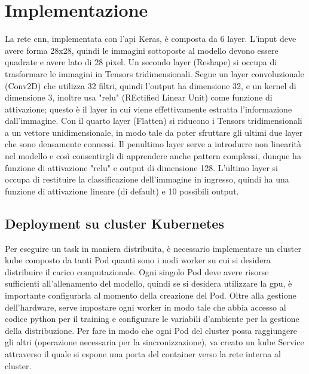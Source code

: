 \documentclass[12pt,a4paper,fleqn,titlepage]{report}
\begin{document}
    \section{Implementazione}
        La rete \gls{cnn}, implementata con l'\gls{api} Keras, è composta da 6 layer. L'input deve avere forma 28x28, quindi le immagini sottoposte al modello devono essere quadrate e avere lato di 28 pixel. Un secondo layer (Reshape) si occupa di trasformare le immagini in Tensors tridimensionali. Segue un layer convoluzionale (Conv2D) che utilizza 32 filtri, quindi l'output ha dimensione 32, e un kernel di dimensione 3, inoltre usa "relu" (REctified Linear Unit) come funzione di attivazione; questo è il layer in cui viene effettivamente estratta l'informazione dall'immagine. Con il quarto layer (Flatten) si riducono i Tensors tridimensionali a un vettore unidimensionale, in modo tale da poter sfruttare gli ultimi due layer che sono densamente connessi. Il penultimo layer serve a introdurre non linearità nel modello e così consentirgli di apprendere anche pattern complessi, dunque ha funzione di attivazione "relu" e output di dimensione 128. L'ultimo layer si occupa di restituire la classificazione dell'immagine in ingresso, quindi ha una funzione di attivazione lineare (di default) e 10 possibili output.

        \subsection{Deployment su cluster Kubernetes}
        Per eseguire un task in maniera distribuita, è necessario implementare un \gls{cluster} \gls{kube} composto da tanti Pod quanti sono i nodi worker su cui si desidera distribuire il carico computazionale. Ogni singolo Pod deve avere risorse sufficienti all'allenamento del modello, quindi se si desidera utilizzare la \gls{gpu}, è importante configurarla al momento della creazione del Pod. Oltre alla gestione dell'hardware, serve impostare ogni worker in modo tale che abbia accesso al codice python per il training e configurare le variabili d'ambiente per la gestione della distribuzione. Per fare in modo che ogni Pod del cluster possa raggiungere gli altri (operazione necessaria per la sincronizzazione), va creato un \gls{kube} Service attraverso il quale si espone una porta del \gls{container} verso la rete interna al \gls{cluster}.
\end{document}

